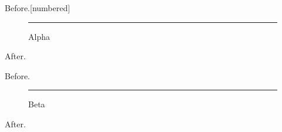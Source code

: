 \documentclass{beamer}
\begin{document}
\begin{frame}[plain,t]
Before.[numbered]
\begin{figure}\rule{20pt}{10pt}\caption{
 Alpha}\end{figure}After.
\end{frame}
\begin{frame}[plain,t]
Before.\begin{figure}\rule{20pt}{10pt}\caption{Beta}\end{figure}After.
\end{frame}
\end{document}
